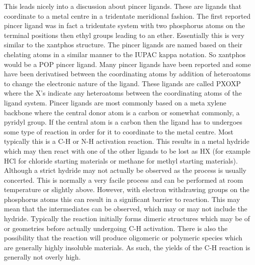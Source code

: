 This leads nicely into a discussion about pincer ligands.  These are ligands that coordinate to a metal centre in a tridentate meridional fashion.  The first reported pincer ligand was in fact a tridentate system with two phosphorus atoms on the terminal positions then ethyl groups leading to an ether.  Essentially this is very similar to the xantphos structure.  The pincer ligands are named based on their chelating atoms in a similar manner to the IUPAC kappa notation.  So xantphos would be a POP pincer ligand.  Many pincer ligands have been reported and some have been derivatised between the coordinating atoms by addition of heteroatoms to change the electronic nature of the ligand.  These ligands are called PXOXP where the X's indicate any heteroatoms between the coordinating atoms of the ligand system.  Pincer ligands are most commonly based on a meta xylene backbone where the central donor atom is a carbon or somewhat commonly, a pyridyl group.  If the central atom is a carbon then the ligand has to undergoes some type of reaction in order for it to coordinate to the metal centre.  Most typically this is a C-H or N-H activation reaction.  This results in a metal hydride which may then react with one of the other ligands to be lost as HX (for example HCl for chloride starting materials or  methane for methyl starting materials).  Although a strict hydride may not actually be observed as the process is usually concerted.  This is normally a very facile process and can be performed at room temperature or slightly above.  However, with electron withdrawing groups on the phosphorus atoms this can result in a significant barrier to reaction.  This may mean that the intermediates can be observed, which may or may not include the hydride.  Typically the reaction initially forms dimeric structures which may be of \cis{} or \trans{} geometries before actually undergoing C-H activation.  There is also the possibility that the reaction will produce oligomeric or polymeric species which are generally highly insoluble materials.  As such, the yields of the C-H reaction is generally not overly high.  


